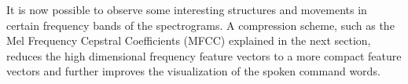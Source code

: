 It is now possible to observe some interesting structures and movements in certain frequency bands of the spectrograms.
A compression scheme, such as the Mel Frequency Cepstral Coefficients (MFCC) explained in the next section, reduces the high dimensional frequency feature vectors to a more compact feature vectors and further improves the visualization of the spoken command words.
